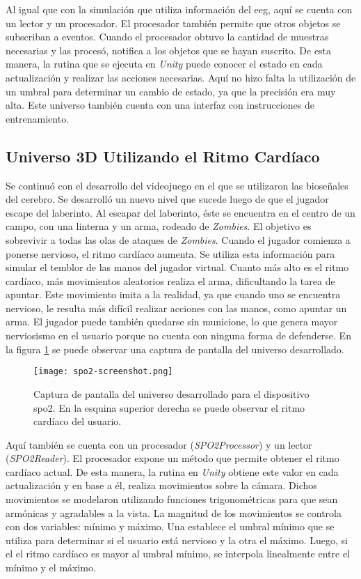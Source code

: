 Al igual que con la simulación que utiliza información del \acrshort{eeg}, aquí se cuenta con un lector y un procesador. El procesador también permite que otros objetos se subscriban a eventos. Cuando el procesador obtuvo la cantidad de muestras necesarias y las procesó, notifica a los objetos que se hayan suscrito. De esta manera, la rutina que se ejecuta en \emph{Unity} puede conocer el estado en cada actualización y realizar las acciones necesarias. Aquí no hizo falta la utilización de un umbral para determinar un cambio de estado, ya que la precisión era muy alta. Este universo también cuenta con una interfaz con instrucciones de entrenamiento.

\subsection{Universo 3D Utilizando el Ritmo Cardíaco}

Se continuó con el desarrollo del videojuego en el que se utilizaron las bioseñales del cerebro. Se desarrolló un nuevo nivel que sucede luego de que el jugador escape del laberinto. Al escapar del laberinto, éste se encuentra en el centro de un campo,  con una linterna y un arma, rodeado de \emph{Zombies}. El objetivo es sobrevivir a todas las olas de ataques de \emph{Zombies}. Cuando el jugador comienza a ponerse nervioso, el ritmo cardíaco aumenta. Se utiliza esta información para simular el temblor de las manos del jugador virtual. Cuanto más alto es el ritmo cardíaco, más movimientos aleatorios realiza el arma, dificultando la tarea de apuntar. Este movimiento imita a la realidad, ya que cuando uno se encuentra nervioso, le resulta más difícil realizar acciones con las manos, como apuntar un arma. El jugador puede también quedarse sin municione, lo que genera mayor nerviosismo en el usuario porque no cuenta con ninguna forma de defenderse. En la figura \ref{fig:spo2-screenshot} se puede observar una captura de pantalla del universo desarrollado.

\begin{figure}[H]
	\centering
    \texttt{[image: spo2-screenshot.png]}
    \caption{Captura de pantalla del universo desarrollado para el dispositivo \acrshort{spo2}. En la esquina superior derecha se puede observar el ritmo cardíaco del usuario.}
	\label{fig:spo2-screenshot}
\end{figure}

Aquí también se cuenta con un procesador (\emph{SPO2Processor}) y un lector (\emph{SPO2Reader}). El procesador expone un método que permite obtener el ritmo cardíaco actual. De esta manera, la rutina en \emph{Unity} obtiene este valor en cada actualización y en base a él, realiza movimientos sobre la cámara. Dichos movimientos se modelaron utilizando funciones trigonométricas para que sean armónicas y agradables a la vista. La magnitud de los movimientos se controla con dos variables: mínimo y máximo. Una establece el umbral mínimo que se utiliza para determinar si el usuario está nervioso y la otra el máximo. Luego, si el el ritmo cardíaco es mayor al umbral mínimo, se interpola linealmente entre el mínimo y el máximo.

